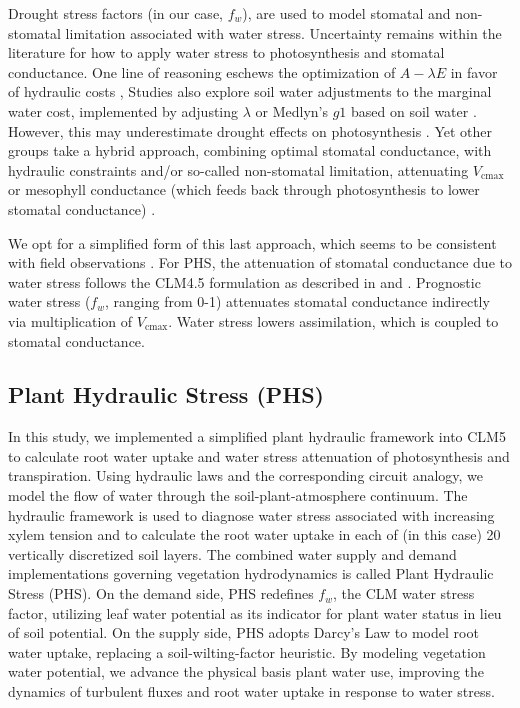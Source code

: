 \documentclass[draft,linenumbers]{agujournal}
\begin{document}
    Drought stress factors (in our case, $f_w$), are used to model stomatal and non-stomatal limitation associated with water stress.
    Uncertainty remains within the literature for how to apply water stress to photosynthesis and stomatal conductance.
    One line of reasoning eschews the optimization of $A-\lambda E$ in favor of hydraulic costs \citep{sperry2017},
    Studies also explore soil water adjustments to the marginal water cost, implemented by adjusting $\lambda$ or Medlyn's $g1$ based on soil water \citep{manzoni2013b}.
    However, this may underestimate drought effects on photosynthesis \citep{zhou2013,lin2018}.
    Yet other groups take a hybrid approach, combining optimal stomatal conductance, with hydraulic constraints and/or
    so-called non-stomatal limitation, attenuating $V_{\text{cmax}}$ or mesophyll conductance
    (which feeds back through photosynthesis to lower stomatal conductance) \citep{egea2011,novick2016a}.
    
    We opt for a simplified form of this last approach, which seems to be consistent with field observations \citep{lin2018}.
    For PHS, the attenuation of stomatal conductance due to water stress follows the CLM4.5 formulation as described in \citet{oleson2013} and \citet{bonan2011}. 
    Prognostic water stress ($f_w$, ranging from 0-1) attenuates stomatal conductance indirectly via multiplication of $V_{\text{cmax}}$.
    Water stress lowers assimilation, which is coupled to stomatal conductance.
    


\subsection{Plant Hydraulic Stress (PHS)}
  In this study, we implemented a simplified plant hydraulic framework into CLM5 to calculate root water uptake and water stress attenuation of photosynthesis and transpiration.
  Using hydraulic laws and the corresponding circuit analogy, we model the flow of water through the soil-plant-atmosphere continuum. 
  The hydraulic framework is used to diagnose water stress associated with increasing xylem tension
  and to calculate the root water uptake in each of (in this case) 20 vertically discretized soil layers.
  The combined water supply and demand implementations governing vegetation hydrodynamics is called Plant Hydraulic Stress (PHS).
  On the demand side, PHS redefines $f_w$, the CLM water stress factor, utilizing leaf water potential as its indicator for plant water status in lieu of soil potential.
  On the supply side, PHS adopts Darcy's Law to model root water uptake, replacing a soil-wilting-factor heuristic.
  By modeling vegetation water potential, we advance the physical basis plant water use, 
  improving the dynamics of turbulent fluxes and root water uptake in response to water stress. 
\end{document}
